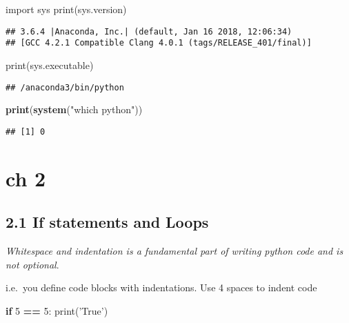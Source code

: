 \documentclass[]{book}
\newenvironment{Shaded}{\begin{snugshade}}{\end{snugshade}}
\newcommand{\BuiltInTok}[1]{#1}
\newcommand{\ControlFlowTok}[1]{\textcolor[rgb]{0.13,0.29,0.53}{\textbf{#1}}}
\newcommand{\DecValTok}[1]{\textcolor[rgb]{0.00,0.00,0.81}{#1}}
\newcommand{\ImportTok}[1]{#1}
\newcommand{\KeywordTok}[1]{\textcolor[rgb]{0.13,0.29,0.53}{\textbf{#1}}}
\newcommand{\NormalTok}[1]{#1}
\newcommand{\OperatorTok}[1]{\textcolor[rgb]{0.81,0.36,0.00}{\textbf{#1}}}
\newcommand{\StringTok}[1]{\textcolor[rgb]{0.31,0.60,0.02}{#1}}
\theoremstyle{definition}
\theoremstyle{definition}
\theoremstyle{definition}
\theoremstyle{remark}
\begin{document}
\begin{Shaded}
\begin{Highlighting}[]
\ImportTok{import}\NormalTok{ sys}
\BuiltInTok{print}\NormalTok{(sys.version)}
\end{Highlighting}
\end{Shaded}

\begin{verbatim}
## 3.6.4 |Anaconda, Inc.| (default, Jan 16 2018, 12:06:34) 
## [GCC 4.2.1 Compatible Clang 4.0.1 (tags/RELEASE_401/final)]
\end{verbatim}

\begin{Shaded}
\begin{Highlighting}[]
\BuiltInTok{print}\NormalTok{(sys.executable)}
\end{Highlighting}
\end{Shaded}

\begin{verbatim}
## /anaconda3/bin/python
\end{verbatim}

\begin{Shaded}
\begin{Highlighting}[]
\KeywordTok{print}\NormalTok{(}\KeywordTok{system}\NormalTok{(}\StringTok{"which python"}\NormalTok{))}
\end{Highlighting}
\end{Shaded}

\begin{verbatim}
## [1] 0
\end{verbatim}

\hypertarget{ch-2}{%
\chapter{ch 2}\label{ch-2}}

\hypertarget{if-statements-and-loops}{%
\section{2.1 If statements and Loops}\label{if-statements-and-loops}}

\emph{Whitespace and indentation is a fundamental part of writing python
code and is not optional}.

i.e.~you define code blocks with indentations. Use 4 spaces to indent
code

\begin{Shaded}
\begin{Highlighting}[]
\ControlFlowTok{if} \DecValTok{5} \OperatorTok{==} \DecValTok{5}\NormalTok{:}
    \BuiltInTok{print}\NormalTok{(}\StringTok{'True'}\NormalTok{)}
    
\end{Highlighting}
\end{Shaded}
\end{document}
